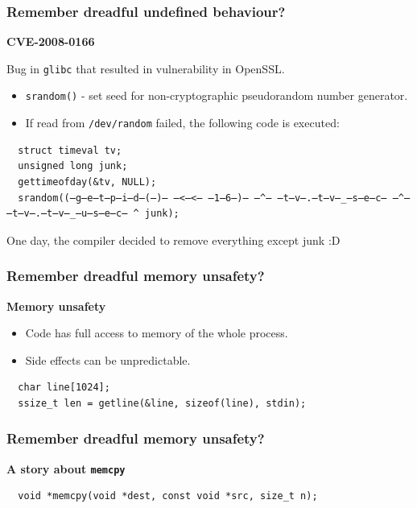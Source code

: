 \documentclass[aspectratio=1610,t]{beamer}
\begin{document}
\begin{frame}[fragile]
\frametitle{Remember dreadful undefined behaviour?}
\textbf{CVE-2008-0166}

Bug in \texttt{glibc} that resulted in vulnerability in OpenSSL.

\begin{itemize}
    \item \texttt{srandom()} - set seed for non-cryptographic pseudorandom number generator.
    \item If read from \texttt{/dev/random} failed, the following code is executed:
\end{itemize}

\begin{verbatim}
  struct timeval tv;
  unsigned long junk;
  gettimeofday(&tv, NULL);
  srandom((̶g̶e̶t̶p̶i̶d̶(̶)̶ ̶<̶<̶ ̶1̶6̶)̶ ̶^̶ ̶t̶v̶.̶t̶v̶_̶s̶e̶c̶ ̶^̶ ̶t̶v̶.̶t̶v̶_̶u̶s̶e̶c̶ ^ junk);
\end{verbatim}

One day, the compiler decided to remove everything except junk :D

\end{frame}


\begin{frame}[fragile]
\frametitle{Remember dreadful memory unsafety?}
\textbf{Memory unsafety}

\begin{itemize}
    \item Code has full access to memory of the whole process.
    \item Side effects can be unpredictable.
\end{itemize}

\begin{verbatim}
  char line[1024];
  ssize_t len = getline(&line, sizeof(line), stdin);  
\end{verbatim}

\end{frame}


\begin{frame}[fragile]
\frametitle{Remember dreadful memory unsafety?}
\textbf{A story about \texttt{memcpy}}

\begin{verbatim}
  void *memcpy(void *dest, const void *src, size_t n);
\end{verbatim}

\end{frame}
\end{document}
